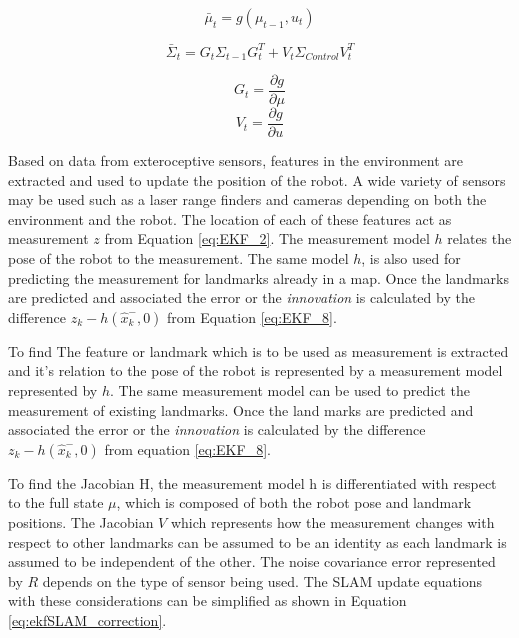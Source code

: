 \begin{equation}
\bar{\mu}_{t} =g(\mu_{t-1},u_{t})
\end{equation}

\begin{equation}
\bar{\Sigma}_{t}=G_{t}\Sigma_{t-1}G_{t}^{T}+V_{t}\Sigma_{Control}V_{t}^{T}
\end{equation}

\begin{equation}
G_{t}=\frac{\partial g}{\partial \mu} 
\end{equation}
\begin{equation}
V_{t}=\frac{\partial g}{\partial u}
\end{equation}
%

 Based on data from exteroceptive sensors, features in the environment are extracted and used to update the position of the robot. A wide variety of sensors may be used such as a laser range finders and cameras depending on both the environment and the robot. The location of each of these features act as measurement $ z $ from Equation \ref{eq:EKF_2}. The measurement model $ h $ relates the pose of the robot to the measurement. The same model $ h $, is also used for predicting the measurement for landmarks already in a map.  Once the landmarks are predicted and associated the error or the \textit{innovation} is calculated by the difference $ z_k-h(\hat{x}^-_k,0) $ from Equation \ref{eq:EKF_8}. 
  
 To find 
 The feature or landmark which is to be used as measurement is extracted and it's relation to the pose of the robot is represented by a measurement model represented by $ h $. The same measurement model can be used to predict the measurement of existing landmarks. Once the land marks are predicted and associated the error or the \textit{innovation} is calculated by the difference $ z_k-h(\hat{x}^-_k,0) $ from equation \ref{eq:EKF_8}. 
 
 To find the Jacobian H, the measurement model h is differentiated with respect to the full state $ \mu $, which is composed of both the robot pose and landmark positions. The Jacobian $ V $ which represents how the measurement changes with respect to other landmarks can be assumed to be an identity as each landmark is assumed to be independent of the other. The noise covariance error represented by $ R $ depends on the type of sensor being used. The SLAM update equations with these considerations can be simplified as shown in Equation \ref{eq:ekfSLAM_correction}.
 
